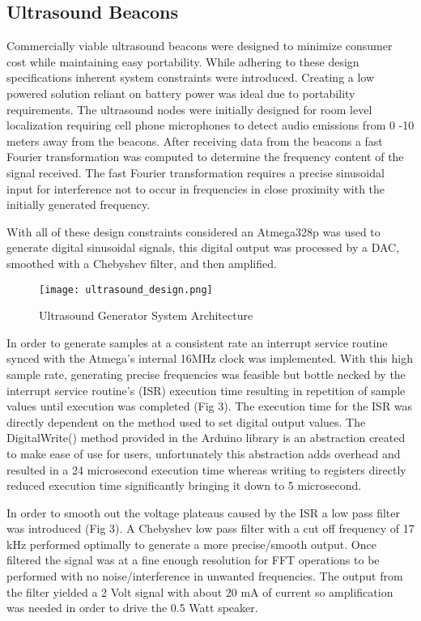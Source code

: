 \subsection{Ultrasound Beacons}
\label{sec:ultrasound-beacons}


	Commercially viable ultrasound beacons were designed to minimize consumer cost while maintaining easy portability.  While adhering to these design specifications inherent system constraints were introduced. Creating a low powered solution reliant on battery power was ideal due to portability requirements.  The ultrasound nodes were initially designed for room level localization requiring cell phone microphones to detect audio emissions from 0 -10 meters away from the beacons. After receiving data from the beacons a fast Fourier transformation was computed to determine the frequency content of the signal received.  The fast Fourier transformation requires a precise sinusoidal input for interference not to occur in frequencies in close proximity with the initially generated frequency.  

	With all of these design constraints considered an Atmega328p was used to generate digital sinusoidal signals, this digital output was processed by a DAC, smoothed with a Chebyshev filter, and then amplified.  
 
\begin{figure}[h]
  \centering
  \texttt{[image: ultrasound\_design.png]}
  \caption{Ultrasound Generator System Architecture}
  \label{fig:ultrasound_design}
\end{figure}

	In order to generate samples at a consistent rate an interrupt service routine synced with the Atmega’s internal 16MHz clock was implemented. With this high sample rate,  generating precise frequencies was feasible but bottle necked by the interrupt service routine's (ISR) execution time resulting in repetition of sample values until execution was completed  (Fig 3). The execution time for the ISR was directly dependent on the method used to set digital output values. The DigitalWrite() method provided in the Arduino library is an abstraction created to make ease of use for users, unfortunately this abstraction adds overhead and resulted in a 24 microsecond execution time whereas writing to registers directly reduced execution time significantly bringing it down to 5 microsecond.  

	In order to smooth out the voltage plateaus caused by the ISR a low pass filter was introduced (Fig 3). A Chebyshev low pass filter with a cut off frequency of 17 kHz performed optimally to generate a more precise/smooth output.  Once filtered the signal was at a fine enough resolution for FFT operations to be performed with no noise/interference in unwanted frequencies.  The output from the filter yielded a 2 Volt signal with about 20 mA of current so amplification was needed in order to drive the 0.5 Watt speaker. 


